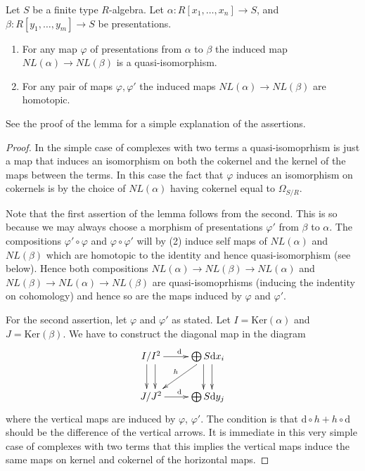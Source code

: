 \begin{lemma}
\label{lemma-NL-homotopy}
Let $S$ be a finite type $R$-algebra.
Let $\alpha : R[x_1,\ldots,x_n] \to S$, and
$\beta : R[y_1,\ldots,y_m] \to S$ be presentations.
\begin{enumerate}
\item For any map $\varphi$ of presentations from
$\alpha$ to $\beta$ the induced map $NL(\alpha) \to NL(\beta)$
is a quasi-isomorphism.
\item For any pair of maps $\varphi, \varphi'$ the induced maps
$NL(\alpha) \to NL(\beta)$ are homotopic.
\end{enumerate}
See the proof of the lemma for a simple explanation
of the assertions.
\end{lemma}

\begin{proof}
In the simple case of complexes with two terms a quasi-isomoprhism
is just a map that induces an isomorphism on both the cokernel
and the kernel of the maps between the terms. In this case the
fact that $\varphi$ induces an isomorphism on cokernels is by
the choice of $NL(\alpha)$ having cokernel equal to $\Omega_{S/R}$.

\medskip\noindent
Note that the first assertion of the lemma follows from the second.
This is so because we may always choose a morphism of presentations
$\varphi'$ from $\beta$ to $\alpha$. The compositions
$\varphi' \circ \varphi$ and $\varphi \circ \varphi'$
will by (2) induce self maps of $NL(\alpha)$ and $NL(\beta)$
which are homotopic to the identity and hence quasi-isomorphism
(see below).
Hence both compositions $NL(\alpha) \to NL(\beta) \to NL(\alpha)$
and $NL(\beta) \to NL(\alpha) \to NL(\beta)$ are quasi-isomoprhisms
(inducing the indentity on cohomology) and hence so are the maps induced
by $\varphi$ and $\varphi'$.

\medskip\noindent
For the second assertion, let $\varphi$ and $\varphi'$ as stated.
Let $I = \text{Ker}(\alpha)$ and $J = \text{Ker}(\beta)$.
We have to construct the diagonal map in the diagram
$$
\xymatrix{
I/I^2 \ar[r]^{\text{d}} \ar@<1ex>[d] \ar@<-1ex>[d]
&
\bigoplus S\text{d}x_i \ar@<1ex>[d] \ar@<-1ex>[d] \ar[ld]_h
\\
J/J^2 \ar[r]^{\text{d}}
&
\bigoplus S\text{d}y_j
}
$$
where the vertical maps are induced by $\varphi$, $\varphi'$.
The condition is that $\text{d} \circ h + h \circ \text{d}$ should be
the difference of the vertical arrows. It is immediate in this
very simple case of complexes with two terms that this implies 
the vertical maps induce the same maps on kernel and cokernel
of the horizontal maps.


\end{proof}
